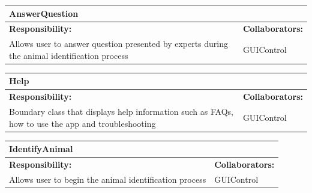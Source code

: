 \documentclass[]{article}
\begin{document}
\begin{table}[H]
	\centering
	\begin{tabular}{|p{5cm}|p{5cm}|}
		\hline
		\multicolumn{2}{|l|}{\textbf{AnswerQuestion}} \\
		\hline
		\textbf{Responsibility:} & \textbf{Collaborators:} \\
		\hline
		 Allows user to answer question presented by experts during the animal identification process & GUIControl \\
\hline
	\end{tabular}
\end{table}
\begin{table}[H]
	\centering
	\begin{tabular}{|p{5cm}|p{5cm}|}
		\hline
		\multicolumn{2}{|l|}{\textbf{Help}} \\
		\hline
		\textbf{Responsibility:} & \textbf{Collaborators:} \\
		\hline
		 Boundary class that displays help information such as FAQs, how to use the app and troubleshooting & GUIControl\\
		\hline
	\end{tabular}
\end{table}
\begin{table}[H]
	\centering
	\begin{tabular}{|p{5cm}|p{5cm}|}
		\hline
		\multicolumn{2}{|l|}{\textbf{IdentifyAnimal}} \\
		\hline
		\textbf{Responsibility:} & \textbf{Collaborators:} \\
		\hline
		 Allows user to begin the animal identification process & GUIControl \\
\hline
	\end{tabular}
\end{table}


\newpage
\end{document}
